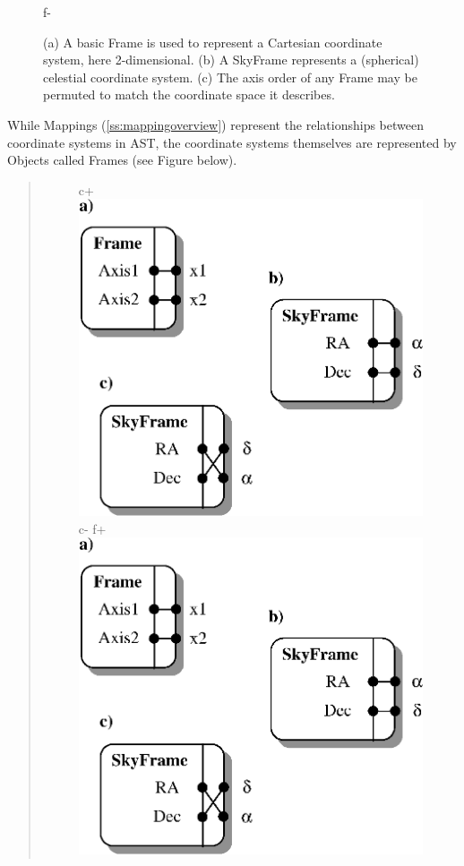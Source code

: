 \documentclass[twoside,11pt]{article}
\newenvironment{latexonly}{}{}
\newcommand{\secref}[1]{\S\ref{#1}}
\renewcommand{\secref}[1]{\ref{#1}}
\begin{document}
\begin{latexonly}
\begin{figure}
\begin{center}
f-
   \caption{(a) A basic Frame is used to represent a Cartesian coordinate
   system, here 2-dimensional. (b) A SkyFrame represents a (spherical)
   celestial coordinate system. (c) The axis order of any Frame may be
   permuted to match the coordinate space it describes.}
   \label{fig:frames}
   \end{center}
   \end{figure}
\end{latexonly}
\begin{htmlonly}
   While Mappings (\secref{ss:mappingoverview}) represent the
   relationships between coordinate systems in AST, the coordinate
   systems themselves are represented by Objects called Frames (see
   Figure below).
   \begin{quote}
   \begin{figure}
   \label{fig:frames}
c+
   \includegraphics[scale=1.5]{sun211_figures/frames.eps}
c-
f+
   \includegraphics[scale=1.5]{sun210_figures/frames.eps}

\end{figure}
\end{quote}
\end{htmlonly}
\end{document}
